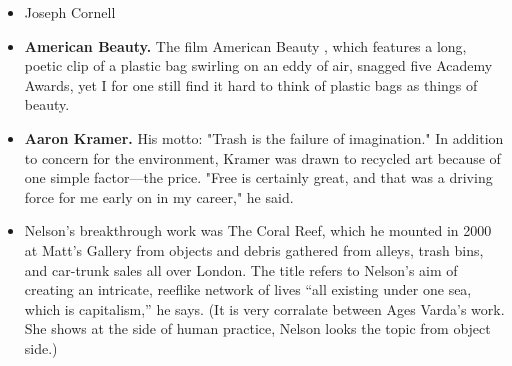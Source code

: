 \begin{itemize}

\item Joseph Cornell

\item \textbf{American Beauty.} The film American Beauty , which features a long, poetic clip of a plastic bag swirling on an eddy of air, snagged five Academy Awards, yet I for one still find it hard to think of plastic bags as things of beauty. 

\item \textbf{Aaron Kramer.} His motto: "Trash is the failure of imagination." \cite{meyer2007turning} In addition to concern for the environment, Kramer was drawn to recycled art because of one simple factor---the price. "Free is certainly great, and that was a driving force for me early on in my career," he said.

\item Nelson’s breakthrough work was The Coral Reef, which he mounted in 2000 at Matt’s Gallery from objects and debris gathered from alleys, trash bins, and car-trunk sales all over London. The title refers to Nelson’s aim of creating an intricate, reeflike network of lives “all existing under one sea, which is capitalism,” he says. (It is very corralate between Ages Varda's work. She shows at the side of human practice, Nelson looks the topic from object side.)


\end{itemize}
